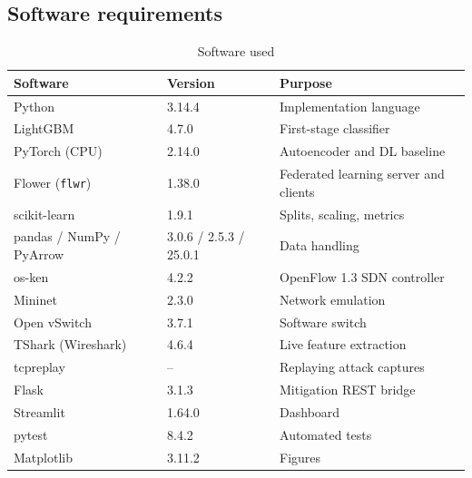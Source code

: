 \subsection{Software requirements}
\begin{table}[H]
\centering
\renewcommand{\arraystretch}{1.25}
\begin{tabular}{|p{4.5cm}|p{3cm}|p{6cm}|}
\hline
\textbf{Software} & \textbf{Version} & \textbf{Purpose} \\ \hline
Python & 3.14.4 & Implementation language \\ \hline
LightGBM & 4.7.0 & First-stage classifier \\ \hline
PyTorch (CPU) & 2.14.0 & Autoencoder and DL baseline \\ \hline
Flower (\texttt{flwr}) & 1.38.0 & Federated learning server and clients \\ \hline
scikit-learn & 1.9.1 & Splits, scaling, metrics \\ \hline
pandas / NumPy / PyArrow & 3.0.6 / 2.5.3 / 25.0.1 & Data handling \\ \hline
os-ken & 4.2.2 & OpenFlow 1.3 SDN controller \\ \hline
Mininet & 2.3.0 & Network emulation \\ \hline
Open vSwitch & 3.7.1 & Software switch \\ \hline
TShark (Wireshark) & 4.6.4 & Live feature extraction \\ \hline
tcpreplay & -- & Replaying attack captures \\ \hline
Flask & 3.1.3 & Mitigation REST bridge \\ \hline
Streamlit & 1.64.0 & Dashboard \\ \hline
pytest & 8.4.2 & Automated tests \\ \hline
Matplotlib & 3.11.2 & Figures \\ \hline
\end{tabular}
\caption{Software used}
\end{table}

